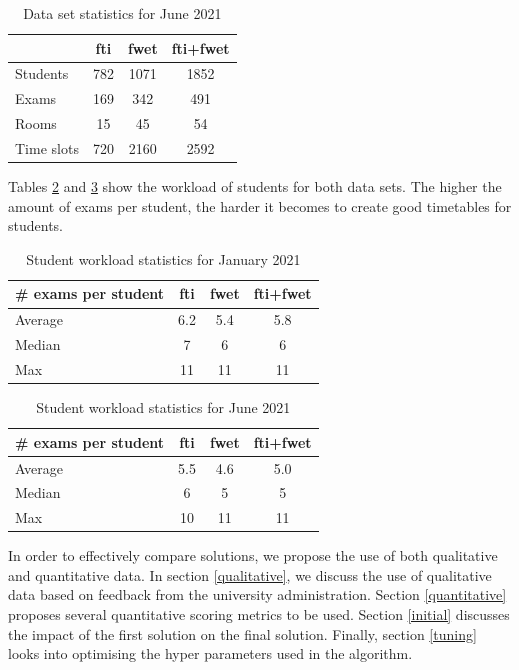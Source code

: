 \begin{table}[H]
	\caption{Data set statistics for June 2021}
	\label{tab:data_set_sem2}
	\centering
	\begin{tabular}{l c c c }
		\hline
		& \textbf{\acrshort{fti}} & \textbf{\acrshort{fwet}} & \textbf{\acrshort{fti}+\acrshort{fwet}} \\ \hline
		Students & 782 & 1071 & 1852 \\
		Exams & 169 & 342 & 491 \\
	    Rooms & 15 & 45 & 54 \\
        Time slots & 720 & 2160 & 2592 \\ \hline
	\end{tabular}
\end{table}

Tables \ref{tab:workload_sem1} and \ref{tab:workload_sem2} show the workload of students for both data sets. The higher the amount of exams per student, the harder it becomes to create good timetables for students. 


\begin{table}[H]
	\caption{Student workload statistics for January 2021}
	\label{tab:workload_sem1}
	\centering
	\begin{tabular}{l c c c }
		\hline
		\textbf{\# exams per student}& \textbf{\acrshort{fti}} & \textbf{\acrshort{fwet}} & \textbf{\acrshort{fti}+\acrshort{fwet}} \\ \hline
		Average  & 6.2 & 5.4 & 5.8 \\
		Median & 7 & 6 & 6 \\
	    Max & 11 & 11 & 11 \\
	\end{tabular}
\end{table}

\begin{table}[H]
	\caption{Student workload statistics for June 2021}
	\label{tab:workload_sem2}
	\centering
	\begin{tabular}{l c c c }
		\hline
		\textbf{\# exams per student}& \textbf{\acrshort{fti}} & \textbf{\acrshort{fwet}} & \textbf{\acrshort{fti}+\acrshort{fwet}} \\ \hline
		Average  & 5.5 & 4.6 & 5.0 \\
		Median & 6 & 5 & 5 \\
	    Max & 10 & 11 & 11 \\
	\end{tabular}
\end{table}

In order to effectively compare solutions, we propose the use of both qualitative and quantitative data. In section \ref{qualitative}, we discuss the use of qualitative data based on feedback from the university administration. Section \ref{quantitative} proposes several quantitative scoring metrics to be used. Section \ref{initial} discusses  the impact of the first solution on the final solution. Finally, section \ref{tuning} looks into optimising the hyper parameters used in the algorithm.

